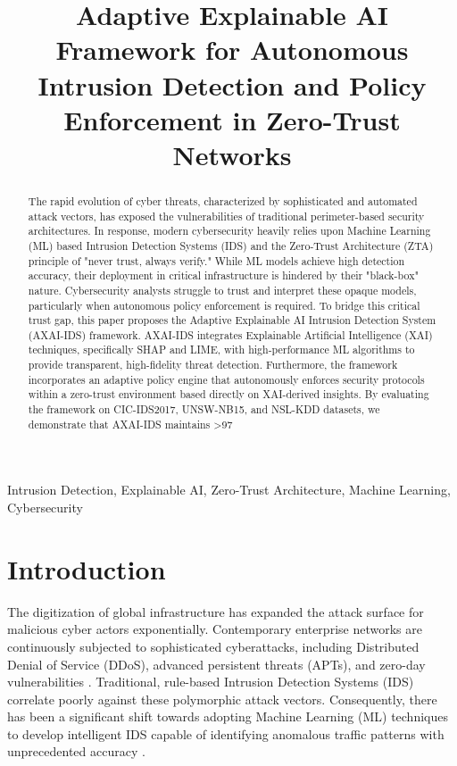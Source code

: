 \documentclass[conference]{IEEEtran}
\begin{document}
\title{Adaptive Explainable AI Framework for Autonomous Intrusion Detection and Policy Enforcement in Zero-Trust Networks}

\author{
}

\maketitle

\begin{abstract}
The rapid evolution of cyber threats, characterized by sophisticated and automated attack vectors, has exposed the vulnerabilities of traditional perimeter-based security architectures. In response, modern cybersecurity heavily relies upon Machine Learning (ML) based Intrusion Detection Systems (IDS) and the Zero-Trust Architecture (ZTA) principle of "never trust, always verify." While ML models achieve high detection accuracy, their deployment in critical infrastructure is hindered by their "black-box" nature. Cybersecurity analysts struggle to trust and interpret these opaque models, particularly when autonomous policy enforcement is required. To bridge this critical trust gap, this paper proposes the Adaptive Explainable AI Intrusion Detection System (AXAI-IDS) framework. AXAI-IDS integrates Explainable Artificial Intelligence (XAI) techniques, specifically SHAP and LIME, with high-performance ML algorithms to provide transparent, high-fidelity threat detection. Furthermore, the framework incorporates an adaptive policy engine that autonomously enforces security protocols within a zero-trust environment based directly on XAI-derived insights. By evaluating the framework on CIC-IDS2017, UNSW-NB15, and NSL-KDD datasets, we demonstrate that AXAI-IDS maintains >97%
\end{abstract}

\begin{IEEEkeywords}
Intrusion Detection, Explainable AI, Zero-Trust Architecture, Machine Learning, Cybersecurity
\end{IEEEkeywords}


\section{Introduction}
The digitization of global infrastructure has expanded the attack surface for malicious cyber actors exponentially. Contemporary enterprise networks are continuously subjected to sophisticated cyberattacks, including Distributed Denial of Service (DDoS), advanced persistent threats (APTs), and zero-day vulnerabilities \cite{wang2021explainable, lundberg2017unified}. Traditional, rule-based Intrusion Detection Systems (IDS) correlate poorly against these polymorphic attack vectors. Consequently, there has been a significant shift towards adopting Machine Learning (ML) techniques to develop intelligent IDS capable of identifying anomalous traffic patterns with unprecedented accuracy \cite{ribeiro2016should, stafford2020zero}.
\end{document}
